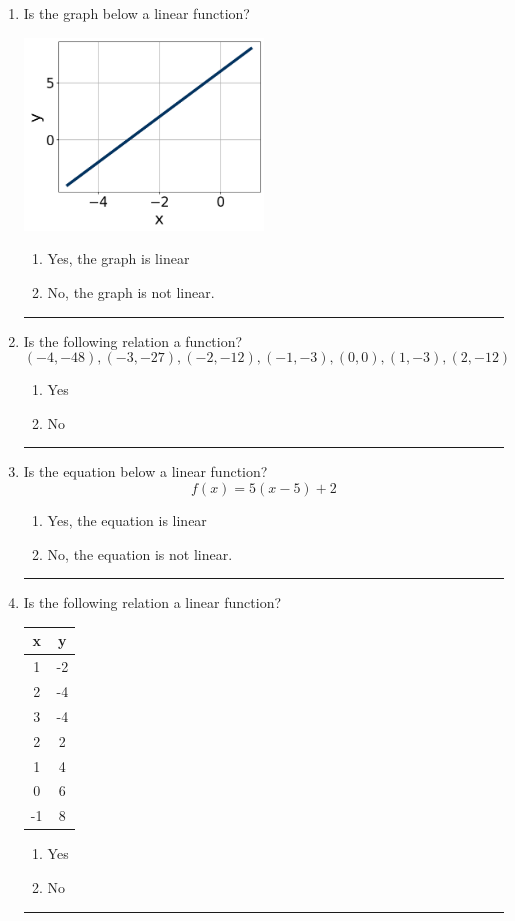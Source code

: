 \documentclass[14pt]{extbook}
\newcommand{\litem}[1]{\item#1\hspace*{-1cm}\rule{\textwidth}{0.4pt}}
\begin{document}
\begin{enumerate}
{\begin{enumerate}[label=\Alph*.]
\end{enumerate} }
\litem{
Is the graph below a linear function?
\begin{center}
    \includegraphics[width=0.5\textwidth]{../Figures/MA_8_F_1_2_graphX.png}
\end{center}
\begin{enumerate}[label=\Alph*.]
\item Yes, the graph is linear
\item No, the graph is not linear.

\end{enumerate} }
\litem{
Is the following relation a function?\[ (-4, -48), (-3, -27), (-2, -12), (-1, -3), (0, 0), (1, -3), (2, -12) \]\begin{enumerate}[label=\Alph*.]
\item Yes
\item No

\end{enumerate} }
\litem{
Is the equation below a linear function?\[ f(x) = 5(x -5)+2 \]\begin{enumerate}[label=\Alph*.]
\item Yes, the equation is linear
\item No, the equation is not linear.

\end{enumerate} }
\litem{
Is the following relation a linear function?

\begin{tabular}{c|c}
x &y\tabularnewline \hline
1 &-2\tabularnewline \hline
2 &-4\tabularnewline \hline
3 &-4\tabularnewline \hline
2 &2\tabularnewline \hline
1 &4\tabularnewline \hline
0 &6\tabularnewline \hline
-1 &8\end{tabular}\begin{enumerate}[label=\Alph*.]
\item Yes
\item No


\end{enumerate}}
\end{enumerate}
\end{document}
